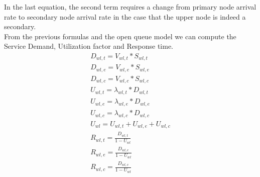 \documentclass[11pt]{article}
\begin{document}
In the last equation, the second term requires a change from primary node arrival rate to secondary node arrival rate in the case that the upper node is indeed a secondary.\\
From the previous formulas and the open queue model we can compute the Service Demand, Utilization factor and Response time.
\begin{equation}
    \begin{array}{l}
        D_{wl, t} = V_{wl, t} * S_{wl, t} \\
        D_{wl, e} = V_{wl, e} * S_{wl, e} \\
        D_{wl, c} = V_{wl, c} * S_{wl, c} \\
        U_{wl, t} = \lambda_{wl, t} * D_{wl, t} \\
        U_{wl, e} = \lambda_{wl, e} * D_{wl, e} \\
        U_{wl, c} = \lambda_{wl, c} * D_{wl, c} \\
        U_{wl} = U_{wl, t} + U_{wl, e} + U_{wl, c} \\
        R_{wl, t} = \frac{D_{wl, t}}{1 - U_{wl}} \\
        R_{wl, e} = \frac{D_{wl, e}}{1 - U_{wl}} \\
        R_{wl, c} = \frac{D_{wl, c}}{1 - U_{wl}} \\
    \end{array}
\end{equation}
\end{document}

